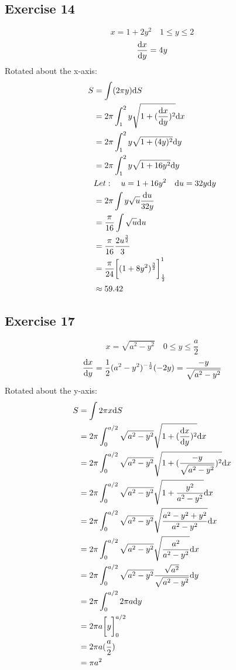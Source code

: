 \documentclass[letterpaper, 12pt]{math}
\begin{document}
\subsection*{Exercise 14}
\[ x = 1+2y^{2} \quad 1 \leq y \leq 2 \]
\[ \frac{\mathrm{d}{x}}{\mathrm{d}{y}} = 4y \]
Rotated about the x-axis:
\begin{align*}
  S &= \int(2\pi y)\mathrm{d}{S} \\
  &= 2\pi\int_{1}^{2}{ y\sqrt{1+(\frac{\mathrm{d}{x}}{\mathrm{d}{y}})^{2}}\mathrm{d}{x}} \\
  &= 2\pi\int_{1}^{2}{y\sqrt{1+(4y)^{2}}\mathrm{d}{y}} \\
  &= 2\pi\int_{1}^{2}{y\sqrt{1+16y^{2}}\mathrm{d}{y}} \\
  & Let: \quad u = 1+16y^{2} \quad \mathrm{d}{u} = 32y\mathrm{d}{y} \\
  &= 2\pi\int{y\sqrt{u}\frac{\mathrm{d}{u}}{32y}} \\
  &= \frac{\pi}{16}\int{\sqrt{u}\mathrm{d}{u}} \\
  &= \frac{\pi}{16}\frac{2u^{\frac{3}{2}}}{3} \\
  &= \frac{\pi}{24}\bigg[(1+8y^{2})^{\frac{3}{2}}\bigg]_{\frac{1}{2}}^{1} \\
  & \approx 59.42
\end{align*}

\subsection*{Exercise 17}
\[ x = \sqrt{a^{2}-y^{2}} \quad 0 \leq y \leq \frac{a}{2} \]
\[ \frac{\mathrm{d}{x}}{\mathrm{d}{y}} = \frac{1}{2}(a^{2}-y^{2})^{-\frac{1}{2}}(-2y)
   = \frac{-y}{\sqrt{a^{2}-y^{2}}} \]
Rotated about the y-axis:
\begin{align*}
  S &= \int{2\pi x\mathrm{d}{S}} \\
  &= 2\pi\int_{0}^{a/2}{
    \sqrt{a^{2}-y^{2}}\sqrt{1+(\frac{\mathrm{d}{x}}{\mathrm{d}{y}})^{2}}\mathrm{d}{x}} \\
  &= 2\pi\int_{0}^{a/2}{
    \sqrt{a^{2}-y^{2}}\sqrt{1+(\frac{-y}{\sqrt{a^{2}-y^{2}}})^{2}}\mathrm{d}{x}} \\
  &= 2\pi\int_{0}^{a/2}{
    \sqrt{a^{2}-y^{2}}\sqrt{1+\frac{y^{2}}{a^{2}-y^{2}}}\mathrm{d}{x}} \\
  &= 2\pi\int_{0}^{a/2}{
    \sqrt{a^{2}-y^{2}}\sqrt{\frac{a^{2}-y^{2}+y^{2}}{a^{2}-y^{2}}}\mathrm{d}{x}} \\
  &= 2\pi\int_{0}^{a/2}{
    \sqrt{a^{2}-y^{2}}\sqrt{\frac{a^{2}}{a^{2}-y^{2}}}\mathrm{d}{x}} \\
  &= 2\pi\int_{0}^{a/2}{
    \sqrt{a^{2}-y^{2}}\frac{\sqrt{a^{2}}}{\sqrt{a^{2}-y^{2}}}\mathrm{d}{y}} \\
  &= 2\pi\int_{0}^{a/2}{2\pi a\mathrm{d}{y}} \\
  &= 2\pi a\bigg[y\bigg]_{0}^{a/2} \\
  &= 2\pi a(\frac{a}{2}) \\
  &= \pi a^{2}
\end{align*}
\end{document}
